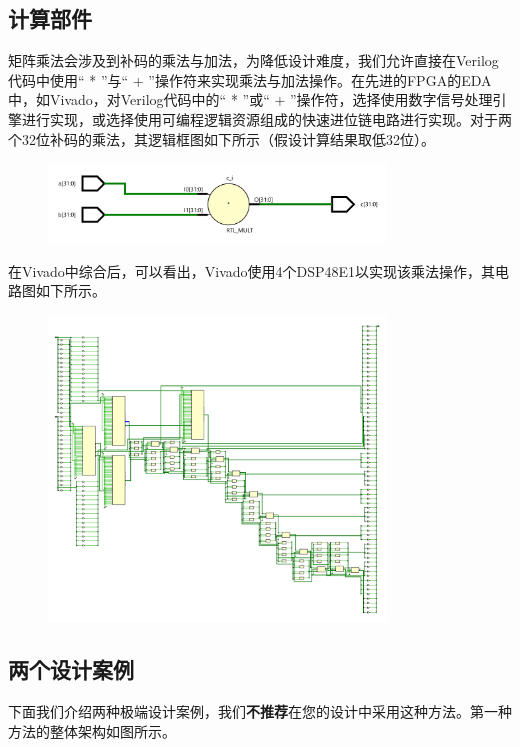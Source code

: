 \documentclass{ctexart}
\begin{document}
\subsection{计算部件}
矩阵乘法会涉及到补码的乘法与加法，为降低设计难度，我们允许直接在Verilog代码中使用“ * ”与“ + ”操作符来实现乘法与加法操作。在先进的FPGA的EDA中，如Vivado，对Verilog代码中的“ * ”或“ + ”操作符，选择使用数字信号处理引擎进行实现，或选择使用可编程逻辑资源组成的快速进位链电路进行实现。对于两个32位补码的乘法，其逻辑框图如下所示（假设计算结果取低32位）。

\begin{figure}[H]
    \centering
    \includegraphics[width=0.8\textwidth]{lab4/5.png}
\end{figure}

在Vivado中综合后，可以看出，Vivado使用4个DSP48E1以实现该乘法操作，其电路图如下所示。

\begin{figure}[H]
    \centering
    \includegraphics[width=0.8\textwidth]{lab4/6.png}
\end{figure}

\subsection{两个设计案例}

下面我们介绍两种极端设计案例，我们\textbf{不推荐}在您的设计中采用这种方法。第一种方法的整体架构如图所示。
\end{document}
